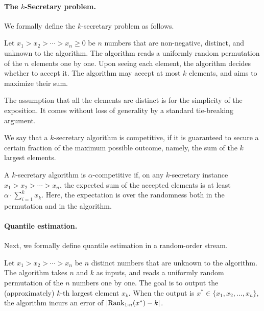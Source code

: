 \paragraph{The $k$-Secretary problem.}
We formally define the $k$-secretary problem as follows.
\begin{problem}[$k$-Secretary]\label{def.ksecretary}
    Let $x_1 > x_2 > \cdots > x_n \ge 0$ be $n$ numbers that are non-negative, distinct, and unknown to the algorithm. The algorithm reads a uniformly random permutation of the $n$ elements one by one. Upon seeing each element, the algorithm decides whether to accept it. The algorithm may accept at most $k$ elements, and aims to maximize their sum.
\end{problem}

The assumption that all the elements are distinct is for the simplicity of the exposition. It comes without loss of generality by a standard tie-breaking argument.

We say that a $k$-secretary algorithm is competitive, if it is guaranteed to secure a certain fraction of the maximum possible outcome, namely, the sum of the $k$ largest elements.

\begin{definition}\label{def.cr}
    A $k$-secretary algorithm is $\alpha$-competitive if, on any $k$-secretary instance $x_1 > x_2 > \cdots > x_n$, the expected sum of the accepted elements is at least $\alpha \cdot \sum_{i=1}^{k}x_k$. Here, the expectation is over the randomness both in the permutation and in the algorithm.
\end{definition}

\paragraph{Quantile estimation.} Next, we formally define quantile estimation in a random-order stream.

\begin{problem}\label{def.quantile_estimation}
Let $x_1 > x_2 > \cdots > x_n$ be $n$ distinct numbers that are unknown to the algorithm. The algorithm takes $n$ and $k$ as inputs, and reads a uniformly random permutation of the $n$ numbers one by one. The goal is to output the (approximately) $k$-th largest element $x_k$. When the output is $x^* \in \{x_1, x_2, \ldots, x_n\}$, the algorithm incurs an error of  $|\mathrm{Rank}_{1:n}(x^*) - k|$.
\end{problem}

